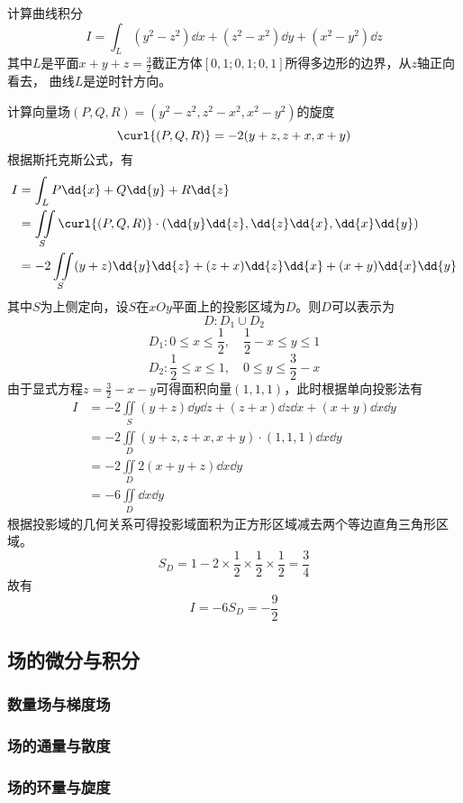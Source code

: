 \begin{example}
    计算曲线积分
    \[ I = \int_L (y^2-z^2)\dd{x} + (z^2-x^2)\dd{y} + (x^2-y^2)\dd{z} \]
    其中$L$是平面$x+y+z=\frac{3}{2}$截正方体$[0,1;0,1;0,1]$所得多边形的边界，从$z$轴正向看去，
    曲线$L$是逆时针方向。
\end{example}
\begin{solution}
    计算向量场$(P,Q,R)=(y^2-z^2, z^2-x^2, x^2-y^2)$的旋度
    \[ \curl{(P,Q,R)} = -2(y+z, z+x, x+y) \]
    根据斯托克斯公式，有
    \begin{align*}
        I & = \int_L P\dd{x} + Q\dd{y} + R\dd{z}                                         \\
          & = \iint\limits_S \curl{(P,Q,R)}\cdot(\dd{y}\dd{z},\dd{z}\dd{x},\dd{x}\dd{y}) \\
          & = -2\iint\limits_S (y+z)\dd{y}\dd{z} + (z+x)\dd{z}\dd{x} + (x+y)\dd{x}\dd{y}
    \end{align*}
    其中$S$为上侧定向，设$S$在$xOy$平面上的投影区域为$D$。则$D$可以表示为
    \[ D: D_1 \cup D_2 \]
    \[ D_1 : 0\leq x\leq \frac{1}{2},\quad \frac{1}{2} - x \leq y \leq 1  \]
    \[ D_2 : \frac{1}{2}\leq x\leq 1,\quad 0 \leq y \leq \frac{3}{2} - x  \]
    由于显式方程$z=\frac{3}{2}-x-y$可得面积向量$(1,1,1)$，此时根据单向投影法有
    \begin{align*}
        I & = -2\iint\limits_S (y+z)\dd{y}\dd{z} + (z+x)\dd{z}\dd{x} + (x+y)\dd{x}\dd{y} \\
          & =-2\iint\limits_D (y+z,z+x,x+y)\cdot(1,1,1)\dd{x}\dd{y}                      \\
          & =-2\iint\limits_D 2(x+y+z)\dd{x}\dd{y}                                       \\
          & =-6\iint\limits_D\dd{x}\dd{y}
    \end{align*}
    根据投影域的几何关系可得投影域面积为正方形区域减去两个等边直角三角形区域。
    \[ S_D = 1 - 2\times\frac{1}{2}\times\frac{1}{2}\times\frac{1}{2} = \frac{3}{4} \]
    故有
    \[ I = -6 S_D= -\frac{9}{2} \]
\end{solution}


\subsection{场的微分与积分}
\subsubsection{数量场与梯度场}
\subsubsection{场的通量与散度}
\subsubsection{场的环量与旋度}